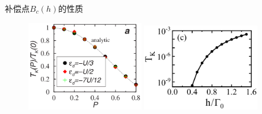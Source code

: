 \documentclass[9pt,t]{beamer} %
\begin{document}
\begin{frame}{补偿点$B_{c}(h)$的性质}
\begin{minipage}[t]{0.45 \textwidth}
\begin{figure}
\includegraphics[width=0.45\textwidth]{Tk-P.png}
\includegraphics[width=0.45\textwidth]{tk-h.png}
\end{figure}
\end{minipage}
\end{frame}
\end{document}
